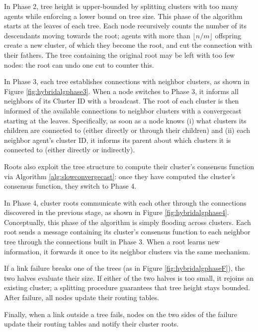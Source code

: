 \documentclass[letterpaper,10pt,conference]{ieeeconf}
\begin{document}
 In Phase 2, tree height is upper-bounded by splitting clusters with too many agents while enforcing a lower bound on tree size. This phase of the algorithm starts at the leaves of each tree. Each node recursively counts the number of its descendants moving towards the root; agents with more than $\lfloor n/m \rfloor$ offspring create a new cluster, of which they become the root, and cut the connection with their fathers. The tree containing the original root may be left with too few nodes: the root can undo one cut to counter this.

In Phase 3, each tree establishes connections with neighbor clusters, as shown in Figure \ref{fig:hybridalgphase3}. When a node switches to Phase 3, it informs all neighbors of its Cluster ID with a broadcast. The root of each cluster is then informed of the available connections to neighbor clusters with a convergecast starting at the leaves. Specifically, as soon as a node knows (i) what clusters its children are connected to (either directly or through their children) and (ii) each neighbor agent's cluster ID, it informs its parent about which clusters it is connected to (either directly or indirectly).

Roots also exploit the tree structure to compute their cluster's consensus function via Algorithm \ref{alg:slowconvergecast}: once they have computed the cluster's consensus function, they switch to Phase 4.

In Phase 4, cluster roots communicate with each other through the connections discovered in the previous stage, as shown in Figure \ref{fig:hybridalgphase4}. Conceptually, this phase of the algorithm is simply flooding across clusters. Each root sends a message containing its cluster's consensus function to each neighbor tree through the connections built in Phase 3.
When a root learns new information, it forwards it once to its neighbor clusters via the same mechanism.

If a link failure breaks one of the trees (as in Figure \ref{fig:hybridalgphaseF}), the two halves evaluate their size. If either of the two halves is too small, it rejoins an existing cluster; a splitting procedure guarantees that tree height stays bounded. After failure, all nodes update their routing tables.

Finally, when a link outside a tree fails, nodes on the two sides of the failure update their routing tables and notify their cluster roots.
\end{document}
